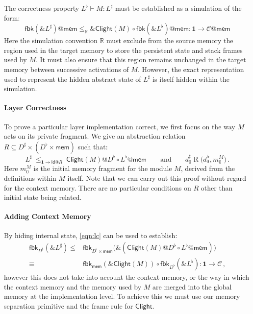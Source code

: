 \documentclass[acmsmall,screen,review,anonymous]{acmart}
\newcommand{\kw}[1]{\ensuremath{ \mathsf{#1} }}
\begin{document}
The correctness property $L^\flat \vdash M : L^\sharp$
must be established as a simulation of the form:
\[
  \kw{fbk}(\&L^\sharp)@\kw{mem}
  \le_\mathbb{R}
  \&\kw{Clight}(M) \circ \kw{fbk}(\&L^\flat)@\kw{mem}
  :
  \mathbf{1} \rightarrow \mathcal{C}@\kw{mem}
\]
Here the simulation convention $\mathbb{R}$
must exclude from the source memory
the region used in the target memory
to store the persistent state and stack frames used by $M$.
It must also ensure that
this region remains unchanged in the target memory
between successive activations of $M$.
However,
the exact representation used
to represent the hidden abstract state of $L^\sharp$
is itself hidden within the simulation.

\paragraph{Layer Correctness}

To prove a particular layer implementation correct,
we first focus on the way $M$ acts on its private fragment.
We give an abstraction relation
$R \subseteq D^\sharp \times (D^\flat \times \kw{mem})$
such that:
\begin{equation}
  L^\sharp
  \:\le_{\mathbf{1} \rightarrow \kw{id}@R}\:
  \kw{Clight}(M)@D^\flat \circ L^\flat@\kw{mem}
  \qquad \text{and} \qquad
  d^\sharp_0 \mathrel{R} \big( d^{\,\flat}_0, m_0^M \big)
  \,.
  \label{eqn:lc}
\end{equation}
Here $m_0^M$ is the initial memory fragment for the module $M$,
derived from the definitions within $M$ itself.
Note that we can carry out this proof without regard for the context memory.
There are no particular conditions on $R$ other than
initial state being related.

\paragraph{Adding Context Memory}

By hiding internal state,
\autoref{eqn:lc} can be used to establish:
\begin{align*}
  \kw{fbk}_{D^\sharp}(\&L^\sharp) \le {} &
  \kw{fbk}_{D^\flat \times \kw{mem}} \big(
    \&(\kw{Clight}(M)@D^\flat \circ L^\flat@\kw{mem})
    \big) \\ \equiv {} &
  \kw{fbk}_\kw{mem}(\&\kw{Clight}(M)) \circ \kw{fbk}_{D^\flat}(\&L^\flat)
  : \mathbf{1} \rightarrow \mathcal{C}
  \,,
\end{align*}
however this does not take into account the context memory,
or the way in which the context memory and the memory used by $M$
are merged into the global memory
at the implementation level.
To achieve this we must use our memory separation primitive
and the frame rule for $\kw{Clight}$.
\end{document}
